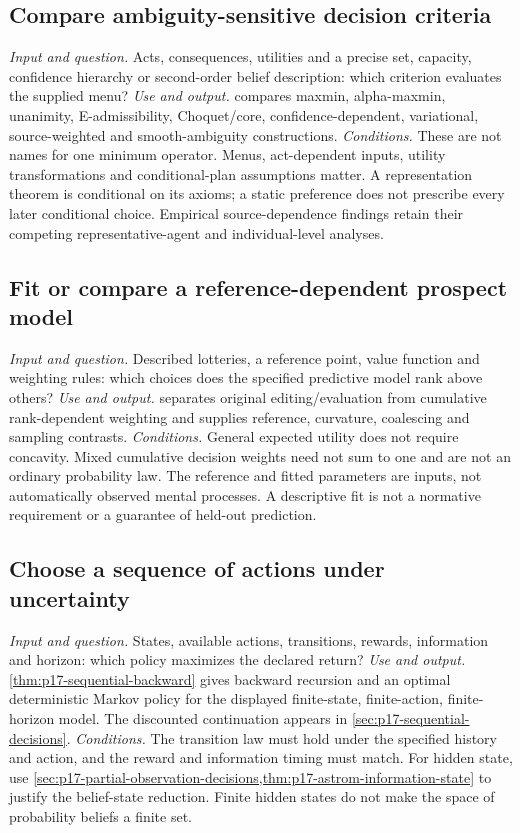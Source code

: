 \subsection{Compare ambiguity-sensitive decision criteria}
\label{sec:p14-finder-ambiguity-criteria}
\textit{Input and question.} Acts, consequences, utilities and a precise set,
capacity, confidence hierarchy or second-order belief description: which
criterion evaluates the supplied menu?
\textit{Use and output.}  compares maxmin,
alpha-maxmin, unanimity, E-admissibility, Choquet/core, confidence-dependent,
variational, source-weighted and smooth-ambiguity constructions.
\textit{Conditions.} These are not names for one minimum operator. Menus,
act-dependent inputs, utility transformations and conditional-plan assumptions
matter. A representation theorem is conditional on its axioms; a static
preference does not prescribe every later conditional choice. Empirical
source-dependence findings retain their competing representative-agent and
individual-level analyses.

\subsection{Fit or compare a reference-dependent prospect model}
\label{sec:p14-finder-prospect-model}
\textit{Input and question.} Described lotteries, a reference point, value
function and weighting rules: which choices does the specified predictive
model rank above others?
\textit{Use and output.}  separates original
editing/evaluation from cumulative rank-dependent weighting and supplies
reference, curvature, coalescing and sampling contrasts.
\textit{Conditions.} General expected utility does not require concavity.
Mixed cumulative decision weights need not sum to one and are not an ordinary
probability law. The reference and fitted parameters are inputs, not
automatically observed mental processes. A descriptive fit is not a normative
requirement or a guarantee of held-out prediction.

\subsection{Choose a sequence of actions under uncertainty}
\label{sec:p14-finder-sequential}
\textit{Input and question.} States, available actions, transitions, rewards,
information and horizon: which policy maximizes the declared return?
\textit{Use and output.}
\cref{thm:p17-sequential-backward} gives backward recursion and an optimal
deterministic Markov policy for the displayed finite-state, finite-action,
finite-horizon model. The discounted continuation appears in
\cref{sec:p17-sequential-decisions}.
\textit{Conditions.} The transition law must hold under the specified
history and action, and the reward and information timing must match.
For hidden state, use
\cref{sec:p17-partial-observation-decisions,thm:p17-astrom-information-state}
to justify the belief-state reduction. Finite hidden states do not make the
space of probability beliefs a finite set.

